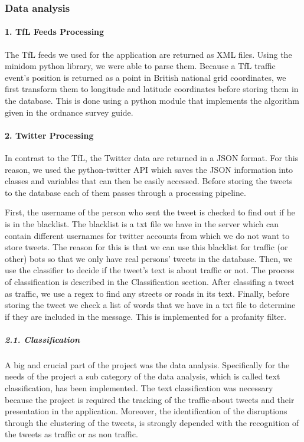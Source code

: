\subsubsection{Data analysis}
\paragraph{1. TfL Feeds Processing}
The TfL feeds we used for the application are returned as XML files. Using the minidom python library, we were able to parse them. Because a TfL traffic event's position is returned as a point in British national grid coordinates, we first transform them to longitude and latitude coordinates before storing them in the database. This is done using a python module that implements the algorithm given in the ordnance survey guide.\cite{website:grid2lonlat_alg} \cite{website:grid2lonlat_impl}

\paragraph{2. Twitter Processing}
In contrast to the TfL, the Twitter data are returned in a JSON format. For this reason, we used the python-twitter API which saves the JSON information into classes and variables that can then be easily accessed. Before storing the tweets to the database each of them passes through a processing pipeline.

First, the username of the person who sent the tweet is checked to find out if he is in the blacklist. The blacklist is a txt file we have in the server which can contain different usernames for twitter accounts from which we do not want to store tweets. The reason for this is that we can use this blacklist for traffic (or other) bots so that we only have real persons' tweets in the database. Then, we use the classifier to decide if the tweet's text is about traffic or not. The process of classification is described in the Classification section. After classifing a tweet as traffic, we use a regex to find any streets or roads in its text. Finally, before storing the tweet we check a list of words that we have in a txt file to determine if they are included in the message. This is implemented for a profanity filter.

\subparagraph{2.1. Classification}
A big and crucial part of the project was the data analysis. Specifically for the needs of the project a sub category of the data analysis, which is called text classification, has been implemented. The text classification was necessary because the project is required the tracking of the traffic-about tweets and their presentation in the application. Moreover, the identification of the disruptions through the clustering of the tweets, is strongly depended with the recognition of the tweets as traffic or as non traffic. 

